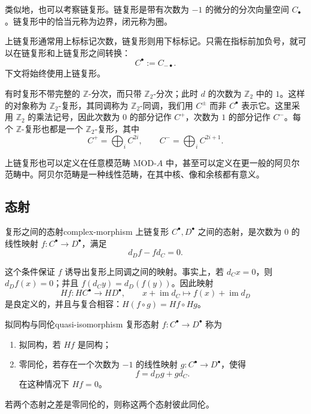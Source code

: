 \begin{note}
类似地，也可以考察链复形。链复形是带有次数为 $-1$ 的微分的分次向量空间 $C_\bullet$。链复形中的恰当元称为边界，闭元称为圈。

上链复形通常用上标标记次数，链复形则用下标标记。只需在指标前加负号，就可以在链复形和上链复形之间转换：
\[
  C^\bullet:=C_{-\bullet}.
\]
下文将始终使用上链复形。
\end{note}

\begin{note}
有时复形不带完整的 $\mathbb Z$-分次，而只带 $\mathbb Z_2$-分次；此时 $d$ 的次数为 $\mathbb Z_2$ 中的 $1$。这样的对象称为 $\mathbb Z_2$-复形，其同调称为 $\mathbb Z_2$-同调，我们用 $C^\pm$ 而非 $C^\bullet$ 表示它。这里采用 $\mathbb Z_2$ 的乘法记号，因此次数为 $0$ 的部分记作 $C^+$，次数为 $1$ 的部分记作 $C^-$。每个 $\mathbb Z$-复形也都是一个 $\mathbb Z_2$-复形，其中
\[
  C^+=\bigoplus_i C^{2i},\qquad C^-=\bigoplus_i C^{2i+1}.
\]
\end{note}

\begin{note}
上链复形也可以定义在任意模范畴 $\mathrm{MOD}\text{-}A$ 中，甚至可以定义在更一般的阿贝尔范畴中。阿贝尔范畴是一种线性范畴，在其中核、像和余核都有意义。
\end{note}

\subsection{态射}\label{subsec:complex-morphisms}
\begin{definition}{复形之间的态射}{complex-morphism}
上链复形 $C^\bullet,D^\bullet$ 之间的态射，是次数为 $0$ 的线性映射 $f\colon C^\bullet\to D^\bullet$，满足
\[
  d_Df-fd_C=0.
\]
\end{definition}
这个条件保证 $f$ 诱导出复形上同调之间的映射。事实上，若 $d_Cx=0$，则 $d_Df(x)=0$；并且 $f(d_Cy)=d_D(f(y))$。因此映射
\[
  Hf\colon HC^\bullet\longrightarrow HD^\bullet,\qquad
  x+\operatorname{im}d_C\longmapsto f(x)+\operatorname{im}d_D
\]
是良定义的，并且与复合相容：$H(f\circ g)=Hf\circ Hg$。

\begin{definition}{拟同构与同伦}{quasi-isomorphism}
复形态射 $f\colon C^\bullet\to D^\bullet$ 称为
\begin{enumerate}
  \item 拟同构，若 $Hf$ 是同构；
  \item 零同伦，若存在一个次数为 $-1$ 的线性映射 $g\colon C^\bullet\to D^\bullet$，使得
  \[
    f=d_Dg+gd_C.
  \]
  在这种情况下 $Hf=0$。
\end{enumerate}
若两个态射之差是零同伦的，则称这两个态射彼此同伦。
\end{definition}

